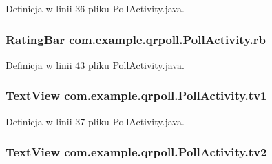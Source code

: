 Definicja w linii 36 pliku Poll\+Activity.\+java.

\hypertarget{classcom_1_1example_1_1qrpoll_1_1_poll_activity_a3c2b3e0864209b0253263a7af2642a13}{
\subsubsection[{rb}]{\setlength{\rightskip}{0pt plus 5cm}Rating\+Bar com.\+example.\+qrpoll.\+Poll\+Activity.\+rb\hspace{0.3cm}{\ttfamily [private]}}}\label{classcom_1_1example_1_1qrpoll_1_1_poll_activity_a3c2b3e0864209b0253263a7af2642a13}


Definicja w linii 43 pliku Poll\+Activity.\+java.

\hypertarget{classcom_1_1example_1_1qrpoll_1_1_poll_activity_a7928323c2d0f40aa25420488718de309}{
\subsubsection[{tv1}]{\setlength{\rightskip}{0pt plus 5cm}Text\+View com.\+example.\+qrpoll.\+Poll\+Activity.\+tv1\hspace{0.3cm}{\ttfamily [private]}}}\label{classcom_1_1example_1_1qrpoll_1_1_poll_activity_a7928323c2d0f40aa25420488718de309}


Definicja w linii 37 pliku Poll\+Activity.\+java.

\hypertarget{classcom_1_1example_1_1qrpoll_1_1_poll_activity_a48f7da0dc1da430cd5ac90a8376cad70}{
\subsubsection[{tv2}]{\setlength{\rightskip}{0pt plus 5cm}Text\+View com.\+example.\+qrpoll.\+Poll\+Activity.\+tv2\hspace{0.3cm}{\ttfamily [private]}}}\label{classcom_1_1example_1_1qrpoll_1_1_poll_activity_a48f7da0dc1da430cd5ac90a8376cad70}


